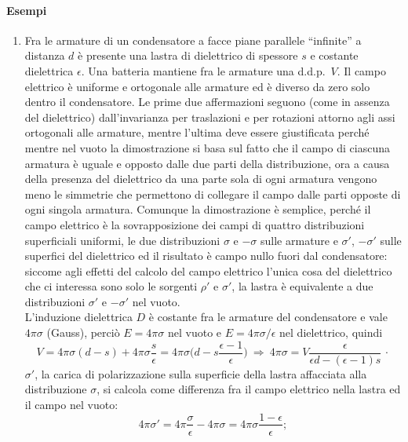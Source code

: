 \paragraph{Esempi}
\begin{enumerate}
  \item Fra le armature di un condensatore a facce piane parallele ``infinite''
    a distanza $d$ \`e presente una lastra di dielettrico di spessore $s$ e
    costante dielettrica $\epsilon$. Una batteria mantiene fra le armature una
    d.d.p.\ $V$.
    Il campo elettrico \`e uniforme e ortogonale alle armature ed \`e diverso da
    zero solo dentro il condensatore. Le prime due affermazioni seguono (come in
    assenza del dielettrico) dall'invarianza per traslazioni e per rotazioni
    attorno agli assi ortogonali alle armature, mentre l'ultima deve essere
    giustificata perch\'e mentre nel vuoto la dimostrazione si basa sul fatto
    che il campo di ciascuna armatura \`e uguale e opposto dalle due parti della
    distribuzione, ora a causa della presenza del dielettrico da una parte sola
    di ogni armatura vengono meno le simmetrie che permettono di collegare il
    campo dalle parti opposte di ogni singola armatura. Comunque la
    dimostrazione \`e semplice, perch\'e il campo elettrico \`e la
    sovrapposizione dei campi di quattro distribuzioni superficiali uniformi, le
    due distribuzioni $\sigma$ e $-\sigma$ sulle armature e $\sigma'$,
    $-\sigma'$ sulle superfici del dielettrico ed il risultato \`e campo nullo
    fuori dal condensatore: siccome agli effetti del calcolo del campo elettrico
    l'unica cosa del dielettrico che ci interessa sono solo le sorgenti $\rho'$
    e $\sigma'$, la lastra \`e equivalente a due distribuzioni $\sigma'$ e
    $-\sigma'$ nel vuoto.\\
    L'induzione dielettrica $D$ \`e costante fra le armature del condensatore e
    vale $4\pi\sigma$ (Gauss), perci\`o $E=4\pi\sigma$ nel vuoto e
    $E=4\pi\sigma/\epsilon$ nel dielettrico, quindi
    \[
      V=4\pi\sigma(d-s)+4\pi\sigma\frac{s}{\epsilon}
      =4\pi\sigma\Big(d-s\frac{\epsilon-1}{\epsilon}\Big)\ \Rightarrow
      \ 4\pi\sigma=V\frac{\epsilon}{\epsilon d-(\epsilon-1)s}\,\cdot
    \]
    $\sigma'$, la carica di polarizzazione sulla superficie della lastra
    affacciata alla distribuzione $\sigma$, si calcola come differenza fra il
    campo elettrico nella lastra ed il campo
    nel vuoto:
    \begin{equation}
      4\pi\sigma'=4\pi\frac{\sigma}{\epsilon}-4\pi\sigma
      =4\pi\sigma\frac{1-\epsilon}{\epsilon};

\end{equation}
\end{enumerate}
